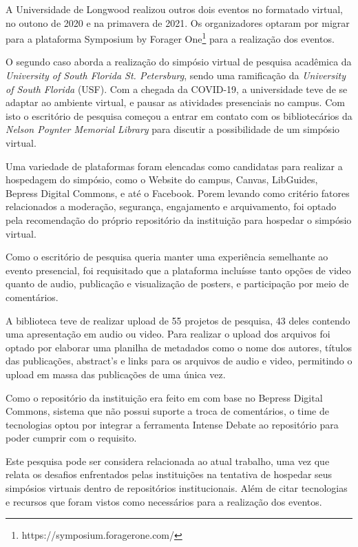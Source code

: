 A Universidade de Longwood realizou outros dois eventos no formatado virtual,
no outono de 2020 e na primavera de 2021. Os organizadores optaram por migrar
para a plataforma Symposium by Forager One\footnote{https://symposium.foragerone.com/}
para a realização dos eventos.

O segundo caso aborda a realização do simpósio virtual de pesquisa acadêmica
da \emph{University of South Florida St. Petersburg}, sendo uma ramificação
da \emph{University of South Florida} (USF). Com a chegada da COVID-19,
a universidade teve de se adaptar ao ambiente virtual, e pausar as atividades
presenciais no campus. Com isto o escritório de pesquisa começou a entrar em contato
com os bibliotecários da \emph{Nelson Poynter Memorial Library} para discutir
a possibilidade de um simpósio virtual.

Uma variedade de plataformas foram elencadas como candidatas para realizar
a hospedagem do simpósio, como o Website do campus, Canvas, LibGuides,
Bepress Digital Commons, e até o Facebook. Porem levando como critério fatores
relacionados a moderação, segurança, engajamento e arquivamento, foi optado
pela recomendação do próprio repositório da instituição para hospedar o
simpósio virtual.

Como o escritório de pesquisa queria manter uma experiência semelhante
ao evento presencial, foi requisitado que a plataforma incluísse tanto opções
de video quanto de audio, publicação e visualização de posters, e participação
por meio de comentários.

A biblioteca teve de realizar upload de 55 projetos de pesquisa, 43 deles
contendo uma apresentação em audio ou video. Para realizar o upload dos arquivos
foi optado por elaborar uma planilha de metadados como o nome dos autores,
títulos das publicações, abstract's e links para os arquivos de audio e video,
permitindo o upload em massa das publicações de uma única vez.

Como o repositório da instituição era feito em com base no Bepress Digital
Commons, sistema que não possui suporte a troca de comentários, o time de
tecnologias optou por integrar a ferramenta Intense Debate ao repositório
para poder cumprir com o requisito.

Este pesquisa pode ser considera relacionada ao atual trabalho, uma vez
que relata os desafios enfrentados pelas instituições na tentativa de
hospedar seus simpósios virtuais dentro de repositórios institucionais.
Além de citar tecnologias e recursos que foram vistos como necessários
para a realização dos eventos.

